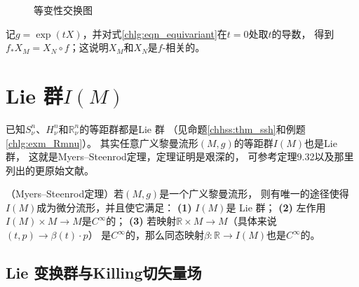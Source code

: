 \begin{figure}[htb]
    \centering
    \caption{等变性交换图}\label{chlg:pic_eqv-exchange}
\end{figure}

记$g=\exp(t X)$，并对式\eqref{chlg:eqn_equivariant}在$t=0$处取$t$的导数，
得到$f_* X_M = X_N \circ f$；这说明$X_M$和$X_N$是$f$-相关的。




\section{ Lie 群$I(M)$}\label{chlg:sec_IM}

已知$S^n_\nu$、$H^n_\nu$和$\mathbb{R}^n_\nu$的等距群都是{\kaishu  Lie 群}
（见命题\ref{chhss:thm_ssh}和例题\ref{chlg:exm_Rmnu}）。
其实任意广义黎曼流形$(M,g)$的等距群$I(M)$也是{\kaishu  Lie 群}，
这就是Myers--Steenrod定理，定理证明是艰深的，
可参考\parencite{oneill1983}定理9.32以及那里列出的更原始文献。


\begin{theorem}\label{chlg:thm_ISOM}
    （Myers--Steenrod定理）若$(M,g)$是一个广义黎曼流形，
    则有唯一的途径使得$I(M)$成为微分流形，并且使它满足：
    {\bfseries (1)} $I(M)$是 Lie 群；
    {\bfseries (2)} 左作用$I(M)\times M\to M$是$C^\infty$的；
    {\bfseries (3)} 若映射$\mathbb{R}\times M\to M$（具体来说$(t,p)\to \beta(t)\cdot p$）
    是$C^\infty$的，那么同态映射$\beta : \mathbb{R}\to I(M)$也是$C^\infty$的。
\end{theorem}


\subsection{ Lie 变换群与Killing切矢量场}\label{chlg:sec_killing}

